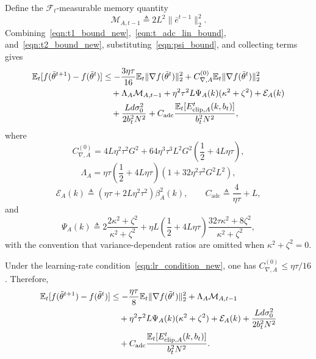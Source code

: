 \documentclass[conference]{IEEEtran}
\begin{document}
Define the $\mathcal{F}_t$-measurable memory quantity
\begin{equation}
    \mathcal{M}_{A,t-1}\triangleq 2L^2\|\bar e^{t-1}\|_2^2.
\end{equation}
Combining~\eqref{eqn:t1_bound_new},~\eqref{eqn:t_adc_lin_bound}, and~\eqref{eqn:t2_bound_new}, substituting~\eqref{eqn:psi_bound}, and collecting terms gives
\begin{align}
    \mathbb{E}_t[f(\tilde\theta^{t+1})-f(\tilde\theta^t)]
    &\le
    -\frac{3\eta\tau}{16}\mathbb{E}_t\|\nabla f(\tilde\theta^t)\|_2^2
    +C_{\nabla,A}^{(0)}\mathbb{E}_t\|\nabla f(\tilde\theta^t)\|_2^2
    \notag\\
    &\quad+
    \Lambda_A\mathcal{M}_{A,t-1}
    +\eta^2\tau^2L\Psi_A(k)(\kappa^2+\zeta^2)
    +\mathcal{E}_A(k)
    \notag\\
    &\quad+
    \frac{Ld\sigma_0^2}{2b_t^2N^2}
    +C_{\mathrm{adc}}\frac{\mathbb{E}_t[E_{\mathrm{clip},A}^t(k,b_t)]}{b_t^2N^2},
\end{align}
where
\begin{equation}
    C_{\nabla,A}^{(0)}
    =4L\eta^2\tau^2G^2
    +64\eta^3\tau^3L^2G^2\left(\frac12+4L\eta\tau\right),
\end{equation}
\begin{equation}
    \Lambda_A
    =\eta\tau\left(\frac12+4L\eta\tau\right)
    \left(1+32\eta^2\tau^2G^2L^2\right),
\end{equation}
\begin{equation}
    \mathcal{E}_A(k)
    \triangleq
    (\eta\tau+2L\eta^2\tau^2)\beta_A^2(k),
    \qquad
    C_{\mathrm{adc}}\triangleq \frac{4}{\eta\tau}+L,
\end{equation}
and
\begin{equation}
    \Psi_A(k)
    \triangleq
    2\frac{2\kappa^2+\zeta^2}{\kappa^2+\zeta^2}
    +\eta L\left(\frac12+4L\eta\tau\right)
    \frac{32\tau\kappa^2+8\zeta^2}{\kappa^2+\zeta^2},
\end{equation}
with the convention that variance-dependent ratios are omitted when $\kappa^2+\zeta^2=0$.

Under the learning-rate condition~\eqref{eqn:lr_condition_new}, one has $C_{\nabla,A}^{(0)}\le \eta\tau/16$. Therefore,
\begin{align}
    \label{eqn:single_step_descent_new}
    \mathbb{E}_t[f(\tilde\theta^{t+1})-f(\tilde\theta^t)]
    &\le
    -\frac{\eta\tau}{8}\mathbb{E}_t\|\nabla f(\tilde\theta^t)\|_2^2
    +\Lambda_A\mathcal{M}_{A,t-1}
    \notag\\
    &\quad+
    \eta^2\tau^2L\Psi_A(k)(\kappa^2+\zeta^2)
    +\mathcal{E}_A(k)
    +\frac{Ld\sigma_0^2}{2b_t^2N^2}
    \notag\\
    &\quad+
    C_{\mathrm{adc}}\frac{\mathbb{E}_t[E_{\mathrm{clip},A}^t(k,b_t)]}{b_t^2N^2}.
\end{align}
\end{document}

